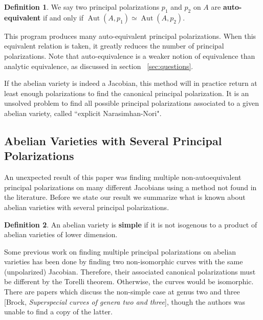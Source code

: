 \documentclass[12pt,reqno]{amsart}
\DeclareMathOperator{\Aut}{Aut}
\theoremstyle{definition}
\newtheorem{defn}{Definition}
\theoremstyle{remark}
\begin{document}


\begin{defn} We say two principal polarizations $p_1$ and $p_2$ on $A$ are \textbf{auto-equivalent} if and only if $\Aut(A, p_1) \simeq \Aut(A, p_2)$. \end{defn}

This program produces many auto-equivalent principal polarizations. When this equivalent relation is taken, it greatly reduces the number of principal polarizations. Note that auto-equivalence is a weaker notion of equivalence than analytic equivalence, as discussed in section ~\ref{sec:questions}. 

If the abelian variety is indeed a Jacobian, this method will in practice return at least enough polarizations to find the canonical principal polarization. It is an unsolved problem to find all possible principal polarizations associated to a given abelian variety, called ``explicit Narasimhan-Nori". 

\subsection{Abelian Varieties with Several Principal Polarizations}
\label{sec:accident}
An unexpected result of this paper was finding multiple non-autoequivalent principal polarizations on many different Jacobians using a method not found in the literature. Before we state our result we summarize what is known about abelian varieties with several principal polarizations.

\begin{defn} An abelian variety is \textbf{simple} if it is not isogenous to a product of abelian varieties of lower dimension. \end{defn}

Some previous work on finding multiple principal polarizations on abelian varieties has been done by finding two non-isomorphic curves with the same (unpolarized) Jacobian. Therefore, their associated canonical polarizations must be different by the Torelli theorem. Otherwise, the curves would be isomorphic. There are papers which discuss the non-simple case at genus two \cite{iko} and three [Brock, \textit{Superspecial curves of genera two and three}], though the authors was unable to find a copy of the latter. 
\end{document}
